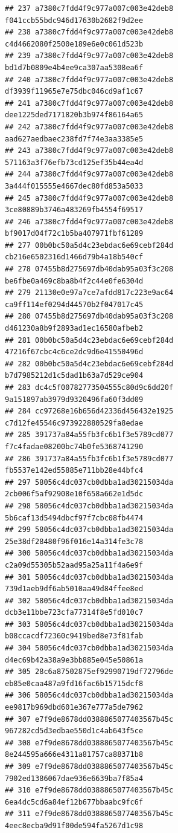 \documentclass[]{article}
\begin{document}
\begin{verbatim}
## 237 a7380c7fdd4f9c977a007c003e42deb8   f041ccb55bdc946d17630b2682f9d2ee
## 238 a7380c7fdd4f9c977a007c003e42deb8   c4d4662080f2500e189e6e0c061d523b
## 239 a7380c7fdd4f9c977a007c003e42deb8   bd1d7b0809e4b4ee9ca307aa5308ea6f
## 240 a7380c7fdd4f9c977a007c003e42deb8   df3939f11965e7e75dbc046cd9af1c67
## 241 a7380c7fdd4f9c977a007c003e42deb8   dee1225ded7171820b3b974f86164a65
## 242 a7380c7fdd4f9c977a007c003e42deb8   aad627aedbaec238fd7f74e3aa3385e5
## 243 a7380c7fdd4f9c977a007c003e42deb8   571163a3f76efb73cd125ef35b44ea4d
## 244 a7380c7fdd4f9c977a007c003e42deb8   3a444f015555e4667dec80fd853a5033
## 245 a7380c7fdd4f9c977a007c003e42deb8   3ce80889b3746a483269fb4554f69517
## 246 a7380c7fdd4f9c977a007c003e42deb8   bf9017d04f72c1b5ba407971fbf61289
## 277 00b0bc50a5d4c23ebdac6e69cebf284d   cb216e6502316d1466d79b4a18b540cf
## 278 07455b8d275697db40dab95a03f3c208   be6fbe0a469c8ba8b4f2c44e0fe6304d
## 279 21130e0e97a7ce7afdd817c223e9ac64   ca9ff114ef0294d44570b2f047017c45
## 280 07455b8d275697db40dab95a03f3c208   d461230a8b9f2893ad1ec16580afbeb2
## 281 00b0bc50a5d4c23ebdac6e69cebf284d   47216f67cbc4c6ce2dc9d6e41550496d
## 282 00b0bc50a5d4c23ebdac6e69cebf284d   b7d7985212d1c5dad1b63a7d529ce904
## 283 dc4c5f00782773504555c80d9c6dd20f   9a151897ab3979d9320496fa60f3dd09
## 284 cc97268e16b656d42336d456432e1925   c7d12fe45546c973922880529fa8edae
## 285 391737a84a55fb3fc6b1f3e5789cd077   f7c4fadae08200bc74b0fe5368741290
## 286 391737a84a55fb3fc6b1f3e5789cd077   fb5537e142ed55885e711bb28e44bfc4
## 297 58056c4dc037cb0dbba1ad30215034da   2cb006f5af92908e10f658a662e1d5dc
## 298 58056c4dc037cb0dbba1ad30215034da   5b6caf13d5494dbcf97f7cbc08fb4474
## 299 58056c4dc037cb0dbba1ad30215034da   25e38df28480f96f016e14a314fe3c78
## 300 58056c4dc037cb0dbba1ad30215034da   c2a09d55305b52aad95a25a11f4a6e9f
## 301 58056c4dc037cb0dbba1ad30215034da   739d1aeb9df6ab5010aa49d84ffee8ed
## 302 58056c4dc037cb0dbba1ad30215034da   dcb3e11bbe723cfa77314f8e5fd010c7
## 303 58056c4dc037cb0dbba1ad30215034da   b08ccacdf72360c9419bed8e73f81fab
## 304 58056c4dc037cb0dbba1ad30215034da   d4ec69b42a38a9e3bb885e045e50861a
## 305 28c6a87502875ef92990719df72796de   eb85e0caa487a9fd16fac6b15715dcf8
## 306 58056c4dc037cb0dbba1ad30215034da   ee9817b969dbd601e367e777a5de7962
## 307 e7f9de8678dd0388865077403567b45c   967282cd5d3edbae550d1c4ab643f5ce
## 308 e7f9de8678dd0388865077403567b45c   8e244595a666e4311a81757ca88371b8
## 309 e7f9de8678dd0388865077403567b45c   7902ed1386067dae936e6639ba7f85a4
## 310 e7f9de8678dd0388865077403567b45c   6ea4dc5cd6a84ef12b677bbaabc9fc6f
## 311 e7f9de8678dd0388865077403567b45c   4eec8ecba9d91f00de594fa5267d1c98

\end{verbatim}
\end{document}
